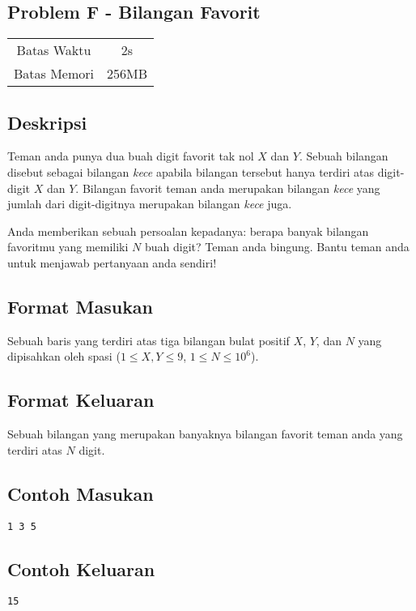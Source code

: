 \documentclass{article}
\begin{document}
\begin{center}
    \section*{Problem F - Bilangan Favorit} %

    \begin{tabular}{ | c c | }
        \hline
        Batas Waktu  & 2s \\    %
        Batas Memori & 256MB \\  %
        \hline
    \end{tabular}
\end{center}

\subsection*{Deskripsi}

Teman anda punya dua buah digit favorit tak nol $X$ dan $Y$. Sebuah bilangan disebut sebagai bilangan \textit{kece} apabila bilangan tersebut hanya terdiri atas digit-digit $X$ dan $Y$. Bilangan favorit teman anda merupakan bilangan \textit{kece} yang jumlah dari digit-digitnya merupakan bilangan \textit{kece} juga. 

Anda memberikan sebuah persoalan kepadanya: berapa banyak bilangan favoritmu yang memiliki $N$ buah digit? Teman anda bingung. Bantu teman anda untuk menjawab pertanyaan anda sendiri!

\subsection*{Format Masukan}

Sebuah baris yang terdiri atas tiga bilangan bulat positif $X$, $Y$, dan $N$ yang dipisahkan oleh spasi ($1 \leq X, Y \leq 9$, $1 \leq N \leq 10^6$).

\subsection*{Format Keluaran}

Sebuah bilangan yang merupakan banyaknya bilangan favorit teman anda yang terdiri atas $N$ digit.
\\

\begin{multicols}{2}
\subsection*{Contoh Masukan}
\begin{lstlisting}
1 3 5
\end{lstlisting}
\columnbreak
\subsection*{Contoh Keluaran}
\begin{lstlisting}
15
\end{lstlisting}
\vfill
\null
\end{multicols}
\end{document}

